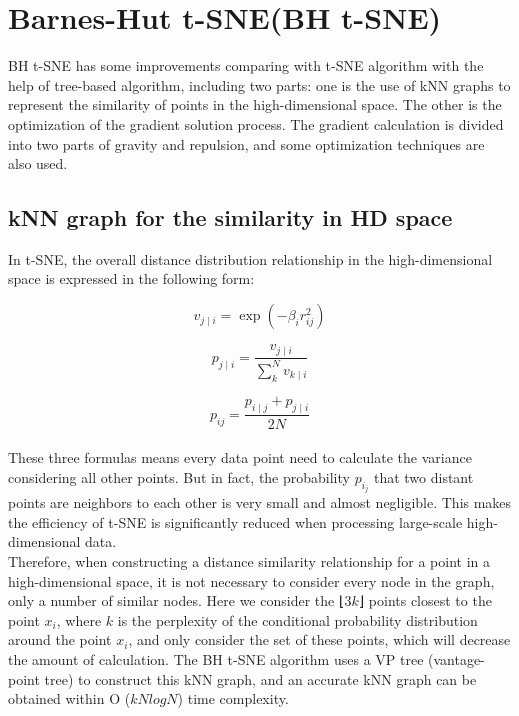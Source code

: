 \section{Barnes-Hut t-SNE(BH t-SNE)}

BH t-SNE has some improvements comparing with t-SNE algorithm with the help of tree-based algorithm, including two parts: one is the use of kNN graphs to represent the similarity of points in the high-dimensional space. The other is the optimization of the gradient solution process. The gradient calculation is divided into two parts of gravity and repulsion, and some optimization techniques are also used.

\subsection{kNN graph for the similarity in HD space}

\noindent In t-SNE, the overall distance distribution relationship in the high-dimensional space is expressed in the following form:

\begin{equation*}
    {v_{j\mid i}} = \exp {(-\beta_i r^2_{ij})} 
\end{equation*}

\begin{equation*}
    {p_{j\mid i}} = \frac {v_{j\mid i}} {\sum_k^N v_{k\mid i}}
\end{equation*}

\begin{equation*}
    {p_{i j}} = \frac {p_{i\mid j} + p_{j\mid i}} {2N}
\end{equation*}\\

\noindent These three formulas means every data point need to calculate the variance considering all other points. But in fact, the probability $p_i_j$ that two distant points are neighbors to each other is very small and almost negligible. This makes the efficiency of t-SNE is significantly reduced when processing large-scale high-dimensional data.\\

\noindent Therefore, when constructing a distance similarity relationship for a point in a high-dimensional space, it is not necessary to consider every node in the graph, only a number of similar nodes. Here we consider the ⌊3$k$⌋ points closest to the point $x_i$, where $k$ is the perplexity of the conditional probability distribution around the point $x_i$, and only consider the set of these points, which will decrease the amount of calculation. The BH t-SNE algorithm uses a VP tree (vantage-point tree) to construct this kNN graph, and an accurate kNN graph can be obtained within O ($kNlogN$) time complexity.\\

